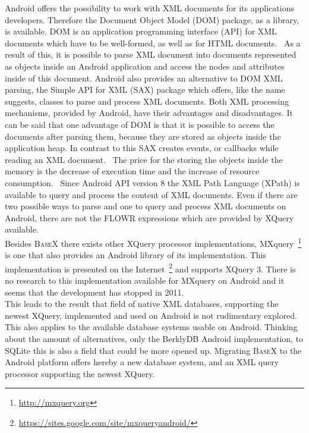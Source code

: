 Android offers the possibility to work with XML documents for its applications developers.
Therefore the Document Object Model (DOM) package, as a library, is available.
DOM is an application programming interface (API) for XML documents which have to be well-formed, as well as for HTML documents.~\cite{nicol2001document}
As a result of this, it is possible to parse XML document into documents represented as objects inside an Android application and access the nodes and attributes inside of this document.
Android also provides an alternative to DOM XML parsing, the Simple API for XML (SAX) package which offers, like the name suggests, classes to parse and process XML documents.
Both XML processing mechanisms, provided by Android, have their advantages and disadvantages.
It can be said that one advantage of DOM is that it is possible to access the documents after parsing them, because they are stored as objects inside the application heap.
In contrast to this SAX creates events, or callbacks while reading an XML document.~\cite{roy2001xml}
The price for the storing the objects inside the memory is the decrease of execution time and the increase of resource consumption.~\cite{chenextracting}
Since Android API version 8 the XML Path Language (XPath) is available to query and process the content of XML documents.
Even if there are two possible ways to parse and one to query and process XML documents on Android, there are not the FLOWR expressions which are provided by XQuery available.\\
Besides \textsc{BaseX} there exists other XQuery processor implementations, MXquery~\footnote{\url{http://mxquery.org}} is one that also provides an Android library of its implementation.
This implementation is presented on the Internet~\footnote{\url{https://sites.google.com/site/mxqueryandroid/}} and supports XQuery 3.
There is no research to this implementation available for MXquery on Android and it seems that the development has stopped in 2011.\\
This leads to the result that field of native XML databases, supporting the newest XQuery, implemented and used on Android is not rudimentary explored.
This also applies to the available database systems usable on Android.
Thinking about the amount of alternatives, only the BerklyDB Android implementation, to SQLite this is also a field that could be more opened up.
Migrating \textsc{BaseX} to the Android platform offers hereby a new database system, and an XML query processor supporting the newest XQuery.

